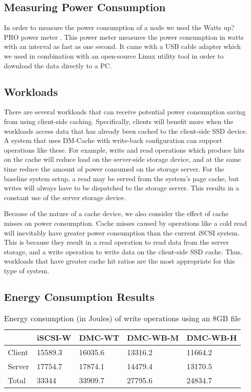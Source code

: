 \subsection{Measuring Power Consumption}

In order to measure the power consumption of a node we used the Watts up? PRO
power meter \cite{wattsup}. This power meter measures the power consumption in
watts with an interval as fast as one second. It came with a USB cable adapter
which we used in combination with an open-source Linux utility tool in order to
download the data directly to a PC.

\subsection{Workloads}

There are several workloads that can receive potential power consumption saving
from using client-side caching. Specifically, clients will benefit more when the
workloads access data that has already been cached to the client-side SSD
device. A system that uses DM-Cache with write-back configuration can support
operations like these. For example, write and read operations which produce hits
on the cache will reduce load on the server-side storage device, and at the same
time reduce the amount of power consumed on the storage server. For the baseline
system setup, a read may be served from the system’s page cache, but writes will
always have to be dispatched to the storage server. This results in a constant
use of the server storage device.

Because of the nature of a cache device, we also consider the effect of cache
misses on power consumption. Cache misses caused by operations like a cold read
will inevitably have greater power consumption than the current iSCSI
system. This is because they result in a read operation to read data from the
server storage, and a write operation to write data on the client-side SSD
cache. Thus, workloads that have greater cache hit ratios are the most
appropriate for this type of system.

\subsection{Energy Consumption Results}

\begin{table}
  \centering
  \resizebox{\linewidth}{!}
  {
    \begin{tabular}{|l|l|l|l|l|}
      \hline & \bf iSCSI-W & \bf DMC-WT & \bf DMC-WB-M & \bf DMC-WB-H \\ \hline
      Client & 15589.3     & 16035.6    & 13316.2      & 11664.2      \\ \hline
      Server & 17754.7     & 17874.1    & 14479.4      & 13170.5      \\ \hline
      Total  & 33344       & 33909.7    & 27795.6      & 24834.7      \\ \hline
    \end{tabular}
  }
  \caption{Energy consumption (in Joules) of write operations using an 8GB file}
  \label{tab:write-energy}
\end{table}

